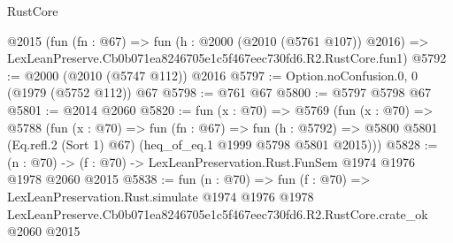 \begin{lexlean}{RustCore}
\begin{coremodule}
    @2015
    (fun (fn : @67) =>
    fun (h : @2000 (@2010 (@5761 @107)) @2016) =>
    LexLeanPreserve.Cb0b071ea8246705e1c5f467eec730fd6.R2.RustCore.fun1)
@5792 := @2000 (@2010 (@5747 @112)) @2016
@5797 := Option.noConfusion.{0, 0} (@1979 (@5752 @112)) @67
@5798 := @761 @67
@5800 := @5797 @5798 @67
@5801 := @2014 @2060
@5820 := fun (x : @70) =>
  @5769
    (fun (x : @70) =>
    @5788
      (fun (x : @70) =>
      fun (fn : @67) =>
      fun (h : @5792) =>
      @5800 @5801 (Eq.refl.{2} (Sort 1) @67) (heq_of_eq.{1} @1999 @5798 @5801 @2015)))
@5828 := (n : @70) -> (f : @70) -> LexLeanPreservation.Rust.FunSem @1974 @1976 @1978 @2060 @2015
@5838 := fun (n : @70) =>
  fun (f : @70) =>
  LexLeanPreservation.Rust.simulate
    @1974
    @1976
    @1978
    LexLeanPreserve.Cb0b071ea8246705e1c5f467eec730fd6.R2.RustCore.crate_ok
    @2060
    @2015
\end{coremodule}
\end{lexlean}
